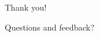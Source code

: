 \begin{frame}
\centering

\vspace{3cm}
\Huge Thank you!
\vspace{0.4cm}

\Large Questions and feedback?
\end{frame}
